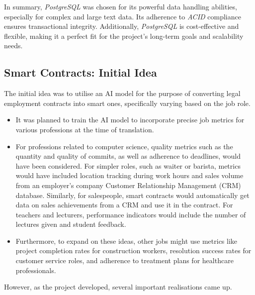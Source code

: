 In summary, \textit{PostgreSQL} was chosen for its powerful data handling abilities, especially for complex and large text data. Its adherence to \textit{ACID} compliance ensures transactional integrity. Additionally, \textit{PostgreSQL} is cost-effective and flexible, making it a perfect fit for the project's long-term goals and scalability needs.

\subsection{Smart Contracts: Initial Idea}

The initial idea was to utilise an AI model for the purpose of converting legal employment contracts into smart ones, specifically varying based on the job role.

\begin{itemize}
    \item It was planned to train the AI model to incorporate precise job metrics for various professions at the time of translation. 
    \item For professions related to computer science, quality metrics such as the quantity and quality of commits, as well as adherence to deadlines, would have been considered. For simpler roles, such as waiter or barista, metrics would have included location tracking during work hours and sales volume from an employer's company Customer Relationship Management (CRM) database. Similarly, for salespeople, smart contracts would automatically get data on sales achievements from a CRM and use it in the contract. For teachers and lecturers, performance indicators would include the number of lectures given and student feedback. 
    \item Furthermore, to expand on these ideas, other jobs might use metrics like project completion rates for construction workers, resolution success rates for customer service roles, and adherence to treatment plans for healthcare professionals. 
\end{itemize}  

However, as the project developed, several important realisations came up.

